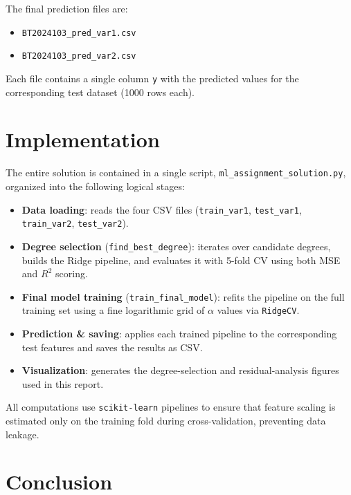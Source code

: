 \documentclass[10.5pt,a4paper]{article}
\begin{document}
The final prediction files are:

\begin{itemize}
    \item \texttt{BT2024103\_pred\_var1.csv}
    \item \texttt{BT2024103\_pred\_var2.csv}
\end{itemize}

Each file contains a single column \texttt{y} with the predicted
values for the corresponding test dataset (1000 rows each).

\section{Implementation}

The entire solution is contained in a single script,
\texttt{ml\_assignment\_solution.py}, organized into the following
logical stages:

\begin{itemize}
    \item \textbf{Data loading}: reads the four CSV files
    (\texttt{train\_var1}, \texttt{test\_var1}, \texttt{train\_var2},
    \texttt{test\_var2}).
    \item \textbf{Degree selection} (\texttt{find\_best\_degree}):
    iterates over candidate degrees, builds the Ridge pipeline, and
    evaluates it with 5-fold CV using both MSE and $R^2$ scoring.
    \item \textbf{Final model training} (\texttt{train\_final\_model}):
    refits the pipeline on the full training set using a fine
    logarithmic grid of $\alpha$ values via \texttt{RidgeCV}.
    \item \textbf{Prediction \& saving}: applies each trained pipeline
    to the corresponding test features and saves the results as CSV.
    \item \textbf{Visualization}: generates the degree-selection and
    residual-analysis figures used in this report.
\end{itemize}

All computations use \texttt{scikit-learn} pipelines to ensure that
feature scaling is estimated only on the training fold during
cross-validation, preventing data leakage.

\section{Conclusion}
\end{document}
